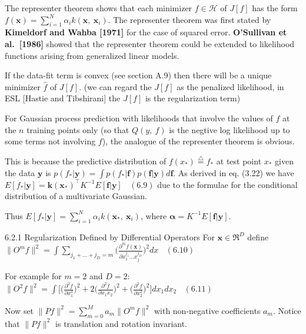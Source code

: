 \documentclass[
  ignorenonframetext,
]{beamer}
\begin{document}
\begin{frame}{}
\protect\hypertarget{section-5}{}
The representer theorem shows that each minimizer \(f \in {\mathcal H}\)
of \(J[f]\) has the form
\(f(\pmb x) = \sum^N_{i=1} \alpha_i k(\pmb x,\ \pmb x_i)\). The
representer theorem was first stated by \textbf{Kimeldorf and Wahba
{[}1971{]}} for the case of squared error. \textbf{O'Sullivan et
al.~{[}1986{]}} showed that the representer theorem could be extended to
likelihood functions arising from generalized linear models.

If the data-fit term is convex (see section A.9) then there will be a
unique minimizer \(\hat f\) of \(J[f]\). (we can regard the \(J[f]\) as
the penalized likelihood, in ESL {[}Hastie and Tibshirani{]} the
\(J[f]\) is the regularization term)

For Gaussian process prediction with likelihoods that involve the values
of \(f\) at the \(n\) training points only (so that \(Q(y,\ f)\) is the
negtive log likelihood up to some terms not involving \(f\)), the
analogue of the representer theorem is obvious.
\end{frame}

\begin{frame}{}
\protect\hypertarget{section-6}{}
This is because the predictive distribution of
\(f(x_*) \stackrel \bigtriangleup = f_*\) at test point \(x_*\) given
the data \(\pmb y\) is
\(p(f_*|\pmb y) = \int p(f_*|\pmb f)p(\pmb f|\pmb y) d\pmb f\). As
derived in eq. (3.22) we have
\(E[f_*|\pmb y] = \pmb k(\pmb x_*)^{\top} K^{-1} E[\pmb f|\pmb y] \ \ \ \ (6.9)\)
due to the formulae for the conditional distribution of a multivariate
Gaussian.

Thus \(E[f_*|\pmb y] = \sum^N_{i=1}\alpha_i k(\pmb x_*,\ \pmb x_i)\),
where \(\pmb \alpha = K^{-1} E[\pmb f|\pmb y]\).
\end{frame}

\begin{frame}{6.2.1 Regularization Defined by Differential Operators}
\protect\hypertarget{regularization-defined-by-differential-operators}{}
For \(\pmb x \in \mathfrak R^D\) define
\(\|O^m f \|^2 = \int \sum_{j_1+...+j_D=m} \Bigg( \frac {\partial^m f(\pmb x)} {\partial x_1^{j_1} ... x_j^{j_D}}\Bigg)^2 dx \ \ \ \ (6.10)\)

For example for \(m = 2\) and \(D = 2\):
\(\|O^2f\|^2 = \int \Bigg[\bigg(\frac {\partial^2 f} {\partial x^2_1}\bigg)^2 + 2 \bigg(\frac {\partial^2 f} {\partial x_1 x_2}\bigg) ^2 + \bigg(\frac {\partial^2 f} {\partial x^2_2}\bigg)^2 \Bigg]dx_1 dx_2\ \ \ \ (6.11)\)

Now set \(\|P f\|^2 =\sum^M_{m=0} a_m \|O^m f\|^2\) with non-negative
coefficients \(a_m\). Notice that \(\|P f\|^2\) is translation and
rotation invariant.
\end{frame}
\end{document}
